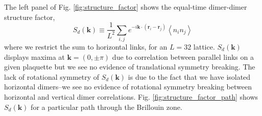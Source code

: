 \documentclass[twocolumn,prb,aps,floatfix,superscriptaddress]{revtex4-1}
\newcommand{\figref}[1]{Fig. \ref{#1}}
\begin{document}
The left panel of \figref{fig:structure_factor} shows the equal-time dimer-dimer structure factor, 
\begin{equation}
S_d\left( \bm{k} \right) \equiv \frac{1}{ L^2} \sum_{i,j} e^{-i \bm{k} \cdot \left(\bm{r}_i - \bm{r}_j\right)} \left \langle n_i n_j \right \rangle
\end{equation}
where we restrict the sum to horizontal links, for an $L=32$ lattice. $S_d(\bm{k})$ displays maxima at $\bm{k} = (0, \pm \pi)$ due to correlation between parallel links on a given plaquette but we see no evidence of translational symmetry breaking. The lack of rotational symmetry of $S_d(\bm{k})$ is due to the fact that we have isolated horizontal dimers--we see no evidence of rotational symmetry breaking between horizontal and vertical dimer correlations. \figref{fig:structure_factor_path} shows $S_d(\bm{k})$ for a particular path through the Brillouin zone.
\end{document}
